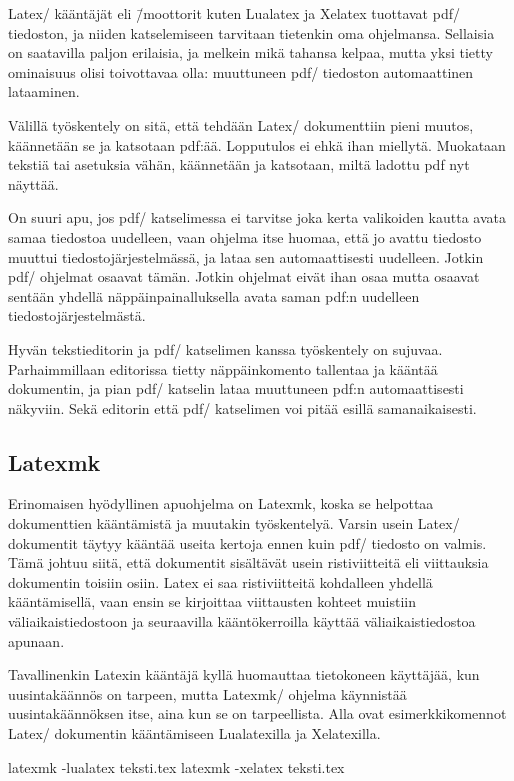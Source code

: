 Latex\-/ kääntäjät eli \=/moottorit kuten Lualatex ja Xelatex tuottavat
pdf\-/ tiedoston, ja niiden katselemiseen tarvitaan tietenkin oma
ohjelmansa. Sellaisia on saatavilla paljon erilaisia, ja melkein mikä
tahansa kelpaa, mutta yksi tietty ominaisuus olisi toivottavaa olla:
muuttuneen pdf\-/ tiedoston automaattinen lataaminen.

Välillä työskentely on sitä, että tehdään Latex\-/ dokumenttiin pieni
muutos, käännetään se ja katsotaan pdf:ää. Lopputulos ei ehkä ihan
miellytä. Muokataan tekstiä tai asetuksia vähän, käännetään ja
katsotaan, miltä ladottu pdf nyt näyttää.

On suuri apu, jos pdf\-/ katselimessa ei tarvitse joka kerta valikoiden
kautta avata samaa tiedostoa uudelleen, vaan ohjelma itse huomaa, että
jo avattu tiedosto muuttui tiedostojärjestelmässä, ja lataa sen
automaattisesti uudelleen. Jotkin pdf\-/ ohjelmat osaavat tämän. Jotkin
ohjelmat eivät ihan osaa mutta osaavat sentään yhdellä
näppäinpainalluksella avata saman pdf:n uudelleen
tiedostojärjestelmästä.

Hyvän tekstieditorin ja pdf\-/ katselimen kanssa työskentely on sujuvaa.
Parhaimmillaan editorissa tietty näppäinkomento tallentaa ja kääntää
dokumentin, ja pian pdf\-/ katselin lataa muuttuneen pdf:n
automaattisesti näkyviin. Sekä editorin että pdf\-/ katselimen voi pitää
esillä samanaikaisesti.

\subsection{Latexmk}
\label{luku/latexmk}

Erinomaisen hyödyllinen apuohjelma on Latexmk, koska se helpottaa
dokumenttien kääntämistä ja muutakin työskentelyä. Varsin usein Latex\-/
dokumentit täytyy kääntää useita kertoja ennen kuin pdf\-/ tiedosto on
valmis. Tämä johtuu siitä, että dokumentit sisältävät usein
ristiviitteitä eli viittauksia dokumentin toisiin osiin. Latex ei saa
ristiviitteitä kohdalleen yhdellä kääntämisellä, vaan ensin se
kirjoittaa viittausten kohteet muistiin väliaikaistiedostoon ja
seuraavilla kääntökerroilla käyttää väliaikaistiedostoa apunaan.

Tavallinenkin Latexin kääntäjä kyllä huomauttaa tietokoneen käyttäjää,
kun uusintakäännös on tarpeen, mutta Latexmk\-/ ohjelma käynnistää
uusintakäännöksen itse, aina kun se on tarpeellista. Alla ovat
esimerkkikomennot Latex\-/ dokumentin kääntämiseen Lualatexilla ja
Xelatexilla.

\begin{koodilohkosis}
latexmk -lualatex teksti.tex
latexmk -xelatex  teksti.tex
\end{koodilohkosis}

